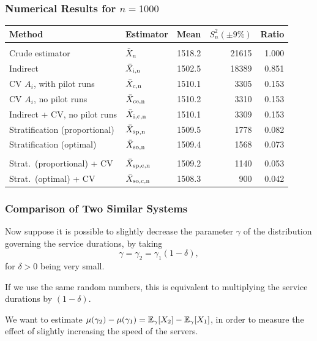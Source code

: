 \documentclass[t,usepdftitle=false]{beamer}
\begin{document}
\begin{frame}
	\frametitle{Numerical Results for \(n = 1000\)}
	
	\begin{small}
		\begin{tabular}{llrrr}
			\hline
			Method                & Estimator
			& Mean   & $S_n^2 (\pm 9\%)$ & Ratio \\
			\hline
			&&&&\\
			Crude estimator             & $\bar X_n$
			& 1518.2 & 21615  &  1.000 \\
			Indirect                    & $\bar X_{\rm{i},n}$
			& 1502.5 & 18389  &  0.851 \\
			CV $A_i$, with pilot runs   & $\bar X_{\rm{c},n}$
			& 1510.1 &  3305  &  0.153 \\
			CV $A_i$, no pilot runs     & $\bar X_{\rm{c}e,n}$
			& 1510.2 &  3310  &  0.153 \\
			Indirect + CV, no pilot runs & $\bar X_{\rm{i},\rm{c},n}$
			& 1510.1 &  3309  &  0.153 \\
			Stratification (proportional)   & $\bar X_{\rm{s}p,n}$
			& 1509.5 &  1778  &  0.082 \\
			Stratification (optimal)    & $\bar X_{\rm{s}o,n}$
			& 1509.4 &  1568  &  0.073 \\
			&&&& \\
			Strat.\ (proportional) + CV & $\bar X_{\rm{s}p,\rm{c},n}$
			& 1509.2 &  1140  &  0.053 \\
			Strat.\ (optimal) + CV & $\bar X_{\rm{s}o,\rm{c},n}$
			& 1508.3 &   900  &  0.042 \\
			\hline
		\end{tabular}
	\end{small}
	
\end{frame}

\begin{frame}
	\frametitle{Comparison of Two Similar Systems}
	
	Now suppose it is possible to slightly decrease the parameter \(\gamma\) of the distribution governing the service durations, by taking
	\[
	\gamma = {\gamma_2} = \gamma_1(1-\delta),
	\]
	for \({\delta} > 0\) being very small.
	
	\mbox{}
	
	If we use the same random numbers, this is equivalent to multiplying the service durations by \((1-\delta)\).
	
	\mbox{}
	
	We want to estimate \(\mu(\gamma_2) - \mu(\gamma_1) = {\mathbb{E}}_\gamma[X_2] - {\mathbb{E}}_\gamma[X_1]\),
	in order to measure the effect of slightly increasing the speed of the servers.
	
\end{frame}
\end{document}

